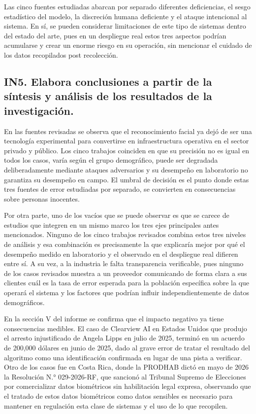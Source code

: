 Las cinco fuentes estudiadas abarcan por separado diferentes deficiencias, el sesgo estadístico del modelo, la discreción humana deficiente y el ataque intencional al sistema. En sí, se pueden considerar limitaciones de este tipo de sistemas dentro del estado del arte, pues en un despliegue real estos tres aspectos podrían acumularse y crear un enorme riesgo en su operación, sin mencionar el cuidado de los datos recopilados post recolección.


\subsection{IN5. Elabora conclusiones a partir de la síntesis y análisis de los resultados de la investigación.}

En las fuentes revisadas se observa que el reconocimiento facial ya dejó de ser una tecnología experimental para convertirse en infraestructura operativa en el sector privado y público. Los cinco trabajos coinciden en que su precisión no es igual en todos los casos, varía según el grupo demográfico, puede ser degradada deliberadamente mediante ataques adversarios y su desempeño en laboratorio no garantiza su desempeño en campo. El umbral de decisión es el punto donde estas tres fuentes de error estudiadas por separado, se convierten en consecuencias sobre personas inocentes.

Por otra parte, uno de los vacíos que se puede observar es que se carece de estudios que integren en un mismo marco los tres ejes principales antes mencionados. Ninguno de los cinco trabajos revisados combina estos tres niveles de análisis y esa combinación es precisamente la que explicaría mejor por qué el desempeño medido en laboratorio y el observado en el despliegue real difieren entre sí. A su vez, a la industria le falta transparencia verificable, pues ninguno de los casos revisados muestra a un proveedor comunicando de forma clara a sus clientes cuál es la tasa de error esperada para la población específica sobre la que operará el sistema y los factores que podrían influir independientemente de datos demográficos.

En la sección V del informe se confirma que el impacto negativo ya tiene consecuencias medibles. El caso de Clearview AI en Estados Unidos que produjo el arresto injustificado de Angela Lipps en julio de 2025, terminó en un acuerdo de 200,000 dólares en junio de 2025, dado al grave error de tratar el resultado del algoritmo como una identificación confirmada en lugar de una pista a verificar. Otro de los casos fue en Costa Rica, donde la PRODHAB dictó en mayo de 2026 la Resolución N.° 029-2026-RF, que sancionó al Tribunal Supremo de Elecciones por comercializar datos biométricos sin habilitación legal expresa, observando que el tratado de estos datos biométricos como datos sensibles es necesario para mantener en regulación esta clase de sistemas y el uso de lo que recopilen.

